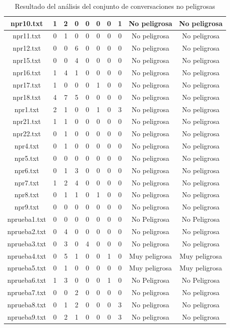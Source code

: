 \begin{table}
\begin{tabular}{|c|c|c|c|c|c|c|c|c|c|}
\hline
npr10.txt &  1 & 2 & 0 & 0 & 0 & 0 & 1 & No peligrosa & No peligrosa \\
\hline
npr11.txt &  0 & 1 & 0 & 0 & 0 & 0 & 0 & No peligrosa & No peligrosa \\
\hline
npr12.txt &  0 & 0 & 6 & 0 & 0 & 0 & 0 & No peligrosa & No peligrosa \\
\hline
npr15.txt &  0 & 0 & 4 & 0 & 0 & 0 & 0 & No peligrosa & No peligrosa \\
\hline
npr16.txt &  1 & 4 & 1 & 0 & 0 & 0 & 0 & No peligrosa & No peligrosa \\
\hline
npr17.txt &  1 & 0 & 0 & 0 & 1 & 0 & 0 & No peligrosa & No peligrosa \\
\hline
npr18.txt &  4 & 7 & 5 & 0 & 0 & 0 & 0 & No peligrosa & No peligrosa \\
\hline
npr1.txt &  2 & 1 & 0 & 0 & 1 & 0 & 3 & No peligrosa & No peligrosa \\
\hline
npr21.txt &  1 & 1 & 0 & 0 & 0 & 0 & 0 & No peligrosa & No peligrosa \\
\hline
npr22.txt &  0 & 1 & 0 & 0 & 0 & 0 & 0& No peligrosa & No peligrosa \\
\hline
npr4.txt &  0 & 1 & 0 & 0 & 0 & 0 & 0 & No peligrosa & No peligrosa \\
\hline
npr5.txt &  0 & 0 & 0 & 0 & 0 & 0 & 0 & No peligrosa & No peligrosa \\
\hline
npr6.txt & 0 & 1 & 3 & 0 & 0 & 0 & 0 & No peligrosa & No peligrosa \\
\hline
npr7.txt &  1 & 2 & 4 & 0 & 0 & 0 & 0 & No peligrosa & No peligrosa \\
\hline
npr8.txt &  0 & 1 & 1 & 0 & 1 & 0 & 0 & No peligrosa & No peligrosa \\
\hline
npr9.txt &  0 & 0 & 0 & 0 & 0 & 0 & 0 & No peligrosa & No peligrosa \\
\hline
nprueba1.txt &  0 & 0 & 0 & 0 & 0 & 0 & 0 & No Peligrosa & No Peligrosa \\
\hline
nprueba2.txt &  0 & 4 & 0 & 0 & 0 & 0 & 0 & No peligrosa & No peligrosa \\
\hline
nprueba3.txt  &  0 & 3& 0 & 4 & 0 & 0 & 0 & No peligrosa & No peligrosa \\
\hline
nprueba4.txt  &  0 & 5 & 1 & 0 & 0 & 1 & 0 & Muy peligrosa & Muy peligrosa \\
\hline
nprueba5.txt &  0 & 1 & 0 & 0 & 0 & 0 & 0 & Muy peligrosa  & Muy peligrosa \\
\hline
nprueba6.txt &  1 & 3 & 0 & 0 & 0 & 1 & 0 & No Peligrosa & No Peligrosa \\
\hline
nprueba7.txt &  0 & 0 & 2 & 0 & 0 & 0 & 0 & No peligrosa & No peligrosa \\
\hline
nprueba8.txt &  0 & 1 & 2 & 0 & 0 & 0 & 3 & No peligrosa & No peligrosa \\ 
\hline
nprueba9.txt &  0 & 2 & 1 & 0 & 0 & 0 & 3 & No peligrosa & No peligrosa \\
\hline

\end{tabular}
\label{tab:tablaresultadosconjuntopruebanopeligroso}
\caption{Resultado del an\'alisis del conjunto de conversaciones no peligrosas}
\end{table}

